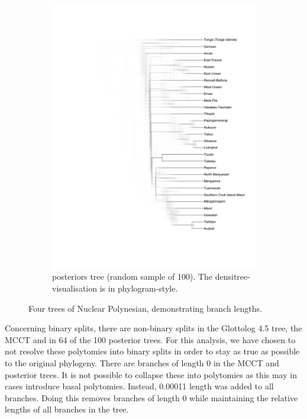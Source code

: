 \documentclass[12pt,letterpaper]{article}
\begin{document}
\begin{figure}[ht]
\begin{subfigure}{0.3\linewidth}
          \includegraphics[width=\textwidth]{illustrations/plots_from_R/tree_plots/poly_tree_example_brlen_gray_posterios.png}
    \caption{\citet{grayetal_2009} posteriors tree (random sample of 100). The densitree-visualisation is in phylogram-style.}
     \label{gray_tree_branch_example_posteriors}
    \end{subfigure}
    
\caption{Four trees of Nuclear Polynesian, demonstrating branch lengths.}
    \label{fig:branch_lengths}
\end{figure}

Concerning binary splits, there are non-binary splits in the Glottolog 4.5 tree, the \citet{grayetal_2009} MCCT and in 64 of the 100 posterior trees. For this analysis, we have chosen to not resolve these polytomies into binary splits in order to stay as true as possible to the original phylogeny. There are branches of length 0 in the MCCT and posterior trees. It is not possible to collapse these into polytomies as this may in cases introduce basal polytomies. Instead, 0.00011 length was added to all branches. Doing this removes branches of length 0 while maintaining the relative lengths of all branches in the tree.
\end{document}
